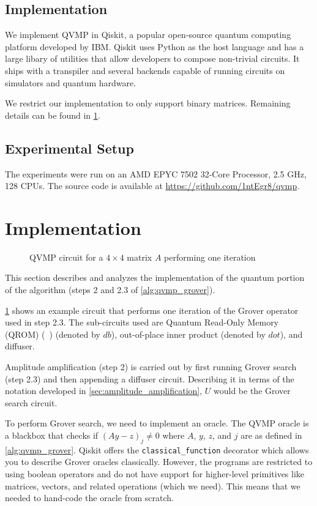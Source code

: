 \documentclass[11pt]{article}
\theoremstyle{definition}
\theoremstyle{remark}
\begin{document}
\subsection{Implementation}

We implement QVMP in Qiskit, a popular open-source quantum computing platform developed by IBM.
Qiskit uses Python as the host language and has a large libary of utilities that allow
developers to compose non-trivial circuits. It ships with a transpiler and
several backends capable of running circuits on simulators and quantum hardware.

We restrict our implementation to only support binary matrices. Remaining
details can be found in \cref{sec:analysis}.

\subsection{Experimental Setup}

The experiments were run on an AMD EPYC 7502 32-Core Processor, 2.5 GHz, 128
CPUs. The source code is available at \url{https://github.com/1ntEgr8/qvmp}.

\section{Implementation} \label{sec:analysis}

\begin{figure}
  \centering
  \scalebox{1.0}{}
  \caption{QVMP circuit for a $4 \times 4$ matrix $A$ performing one iteration}
  \label{fig:qvmp_oracle_4x4}
\end{figure}

This section describes and analyzes the implementation of the quantum portion of
the algorithm (steps 2 and 2.3 of \cref{alg:qvmp_grover}). 

\cref{fig:qvmp_oracle_4x4} shows an example circuit that performs one
iteration of the Grover operator used in step 2.3. The sub-circuits used are
Quantum Read-Only Memory (QROM) (~\cite{babbush2018encoding}) (denoted by $db$), out-of-place
inner product (denoted by $dot$), and diffuser.

Amplitude amplification (step 2) is carried out by first running Grover
search (step 2.3) and then appending a diffuser circuit. Describing it in terms
of the notation developed in \cref{sec:amplitude_amplification}, $U$ would be
the Grover search circuit.

To perform Grover search, we need to implement an oracle. The QVMP oracle is a
blackbox that checks if $(Ay - z)_j \neq 0$ where $A$, $y$, $z$, and $j$ are as
defined in \cref{alg:qvmp_grover}. Qiskit offers the \verb+classical_function+
decorator which allows you to describe Grover oracles classically. However, the
programs are restricted to using boolean operators and do not have support for
higher-level primitives like matrices, vectors, and related operations (which we
need). This means that we needed to hand-code the oracle from scratch.
\end{document}
